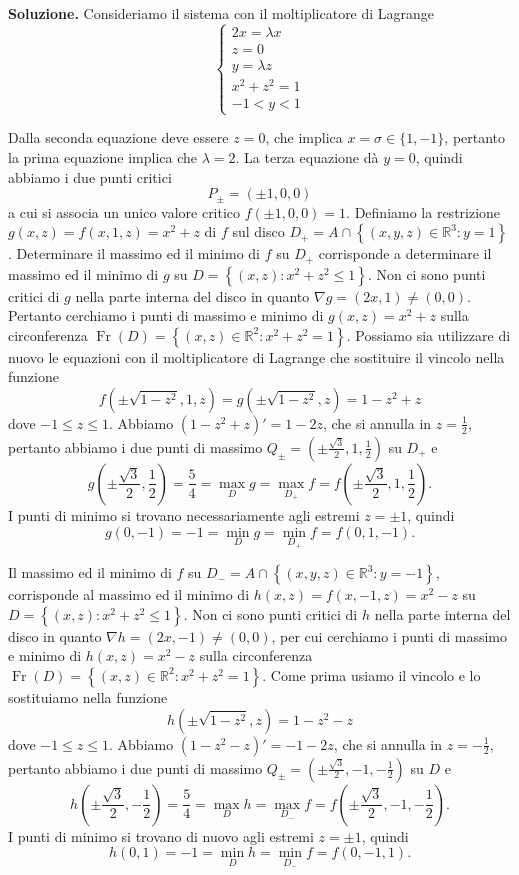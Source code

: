 \begin{enumerate}
	\textbf{Soluzione.}
		Consideriamo il sistema con il moltiplicatore di Lagrange
		\[
		\begin{cases}
			2x = \lambda x \\
			z = 0 \\
			y = \lambda z \\
			x^2 + z^2 = 1 \\
			-1 < y < 1
		\end{cases}
		\]
		
		Dalla seconda equazione deve essere $z = 0$, che implica $x = \sigma \in \{1,-1\}$, pertanto la prima equazione implica che $\lambda = 2$. La terza equazione dà $y = 0$, quindi abbiamo i due punti critici
		\[
		P_{\pm} = (\pm 1,0,0)
		\]
		a cui si associa un unico valore critico $f(\pm 1,0,0) = 1$. Definiamo la restrizione $g(x,z) = f(x,1,z) = x^2 + z$ di $f$ sul disco $D_+ = A \cap \left\{(x,y,z) \in \mathbb{R}^3 : y = 1\right\}$. Determinare il massimo ed il minimo di $f$ su $D_+$ corrisponde a determinare il massimo ed il minimo di $g$ su $D = \left\{(x,z) : x^2 + z^2 \leq 1\right\}$. Non ci sono punti critici di $g$ nella parte interna del disco in quanto $\nabla g = (2x,1) \neq (0,0)$. Pertanto cerchiamo i punti di massimo e minimo di $g(x,z) = x^2 + z$ sulla circonferenza $\operatorname{Fr}(D) = \left\{(x,z) \in \mathbb{R}^2 : x^2 + z^2 = 1\right\}$. Possiamo sia utilizzare di nuovo le equazioni con il moltiplicatore di Lagrange che sostituire il vincolo nella funzione
		\[
		f\left(\pm \sqrt{1-z^2}, 1, z\right) = g\left(\pm \sqrt{1-z^2}, z\right) = 1 - z^2 + z
		\]
		dove $-1 \leq z \leq 1$. Abbiamo $(1-z^2+z)' = 1-2z$, che si annulla in $z = \frac{1}{2}$, pertanto abbiamo i due punti di massimo $Q_{\pm} = (\pm \frac{\sqrt{3}}{2}, 1, \frac{1}{2})$ su $D_+$ e
		\[
		g\left(\pm \frac{\sqrt{3}}{2}, \frac{1}{2}\right) = \frac{5}{4} = \max_D g = \max_{D_+} f = f\left(\pm \frac{\sqrt{3}}{2}, 1, \frac{1}{2}\right).
		\]
		I punti di minimo si trovano necessariamente agli estremi $z = \pm 1$, quindi
		\[
		g(0,-1) = -1 = \min_D g = \min_{D_+} f = f(0,1,-1).
		\]
		
		Il massimo ed il minimo di $f$ su $D_- = A \cap \left\{(x,y,z) \in \mathbb{R}^3 : y = -1\right\}$, corrisponde al massimo ed il minimo di $h(x,z) = f(x,-1,z) = x^2 - z$ su $D = \left\{(x,z) : x^2 + z^2 \leq 1\right\}$. Non ci sono punti critici di $h$ nella parte interna del disco in quanto $\nabla h = (2x, -1) \neq (0,0)$, per cui cerchiamo i punti di massimo e minimo di $h(x,z) = x^2 - z$ sulla circonferenza $\operatorname{Fr}(D) = \left\{(x,z) \in \mathbb{R}^2 : x^2 + z^2 = 1\right\}$. Come prima usiamo il vincolo e lo sostituiamo nella funzione
		\[
		h\left(\pm \sqrt{1-z^2}, z\right) = 1 - z^2 - z
		\]
		dove $-1 \leq z \leq 1$. Abbiamo $(1-z^2-z)' = -1-2z$, che si annulla in $z = -\frac{1}{2}$, pertanto abbiamo i due punti di massimo $Q_{\pm} = (\pm \frac{\sqrt{3}}{2}, -1, -\frac{1}{2})$ su $D$ e
		\[
		h\left(\pm \frac{\sqrt{3}}{2}, -\frac{1}{2}\right) = \frac{5}{4} = \max_D h = \max_{D_-} f = f\left(\pm \frac{\sqrt{3}}{2}, -1, -\frac{1}{2}\right).
		\]
		I punti di minimo si trovano di nuovo agli estremi $z = \pm 1$, quindi
		\[
		h(0,1) = -1 = \min_D h = \min_{D_-} f = f(0,-1,1).
		\]
		

\end{enumerate}
